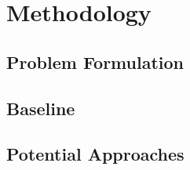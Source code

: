 \FloatBarrier
\section{Methodology}    
    \subsection{Problem Formulation}

    \subsection{Baseline}

    \subsection{Potential Approaches}

